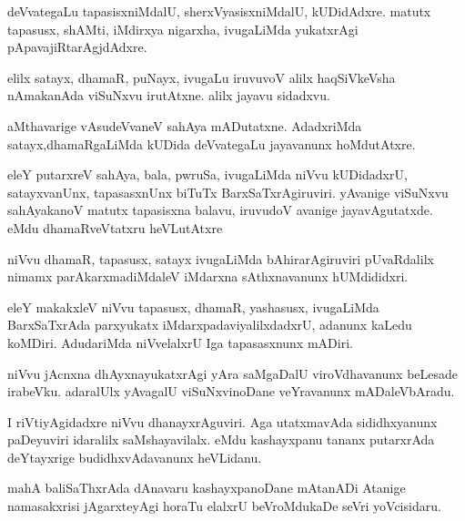 \documentclass{article}
\begin{document}
\begin{mn}
deVvategaLu tapasisxniMdalU, sherxVyasisxniMdalU, kUDidAdxre. matutx tapasusx, 
shAMti, iMdirxya nigarxha, ivugaLiMda yukatxrAgi pApavajiRtarAgjdAdxre.
\end{mn}

\begin{mn}
elilx satayx, dhamaR, puNayx, ivugaLu iruvuvoV alilx haqSiVkeVsha nAmakanAda 
viSuNxvu irutAtxne. alilx jayavu sidadxvu. 
\end{mn}

\begin{mn}
aMthavarige vAsudeVvaneV sahAya mADutatxne. AdadxriMda satayx,dhamaRgaLiMda 
kUDida deVvategaLu jayavanunx hoMdutAtxre.
\end{mn}

\begin{mn}
eleY putarxreV sahAya, bala, pwruSa, ivugaLiMda niVvu kUDidadxrU, satayxvanUnx, 
tapasasxnUnx biTuTx BarxSaTxrAgiruviri. yAvanige viSuNxvu sahAyakanoV matutx 
tapasisxna balavu, iruvudoV avanige jayavAgutatxde. eMdu dhamaRveVtatxru heVLutAtxre 
\end{mn}

\begin{mn}
niVvu dhamaR, tapasusx, satayx ivugaLiMda bAhirarAgiruviri pUvaRdalilx 
nimamx parAkarxmadiMdaleV iMdarxna sAthxnavanunx hUMdididxri.
\end{mn}

\begin{mn}
eleY makakxleV niVvu tapasusx, dhamaR, yashasusx, ivugaLiMda BarxSaTxrAda
parxyukatx iMdarxpadaviyalilxdadxrU, adanunx kaLedu koMDiri. AdudariMda
niVvelalxrU Iga tapasasxnunx mADiri.
\end{mn}

\begin{mn}
niVvu jAcnxna dhAyxnayukatxrAgi yAra saMgaDalU viroVdhavanunx beLesade 
irabeVku. adaralUlx yAvagalU viSuNxvinoDane veYravanunx mADaleVbAradu.
\end{mn}

\begin{mn}
I riVtiyAgidadxre niVvu dhanayxrAguviri. Aga utatxmavAda sididhxyanunx 
paDeyuviri idaralilx saMshayavilalx. eMdu kashayxpanu tananx putarxrAda 
deYtayxrige budidhxvAdavanunx heVLidanu. 
\end{mn}

\begin{mn}
mahA baliSaThxrAda dAnavaru kashayxpanoDane mAtanADi Atanige namasakxrisi 
jAgarxteyAgi horaTu elalxrU beVroMdukaDe seVri yoVcisidaru.
\end{mn}
\end{document}

